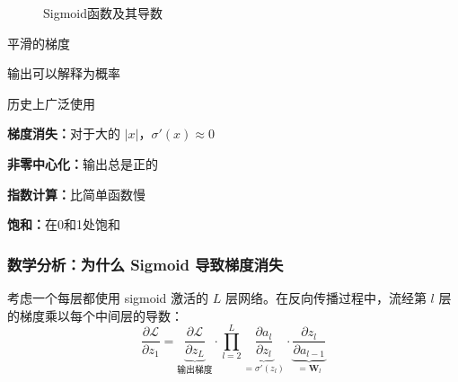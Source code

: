 \begin{figure}[htbp]
    \centering
    \caption[Sigmoid函数及其导数]{Sigmoid函数及其导数}
    \label{fig:sigmoid}
\end{figure}

\begin{advantages}
    \item 平滑的梯度
    \item 输出可以解释为概率
    \item 历史上广泛使用
\end{advantages}

\begin{disadvantages}
    \item \textbf{梯度消失：}对于大的 $|x|$，$\sigma'(x) \approx 0$
    \item \textbf{非零中心化：}输出总是正的
    \item \textbf{指数计算：}比简单函数慢
    \item \textbf{饱和：}在0和1处饱和
\end{disadvantages}

\subsubsection{数学分析：为什么 Sigmoid 导致梯度消失}

考虑一个每层都使用 sigmoid 激活的 $L$ 层网络。在反向传播过程中，流经第 $l$ 层的梯度乘以每个中间层的导数：
\begin{equation}
\frac{\partial \mathcal{L}}{\partial z_1} = \underbrace{\frac{\partial \mathcal{L}}{\partial z_L}}_{\text{输出梯度}} \cdot \prod_{l=2}^{L} \underbrace{\frac{\partial a_l}{\partial z_l}}_{= \sigma'(z_l)} \cdot \underbrace{\frac{\partial z_l}{\partial a_{l-1}}}_{= \mathbf{W}_l}
\end{equation}

